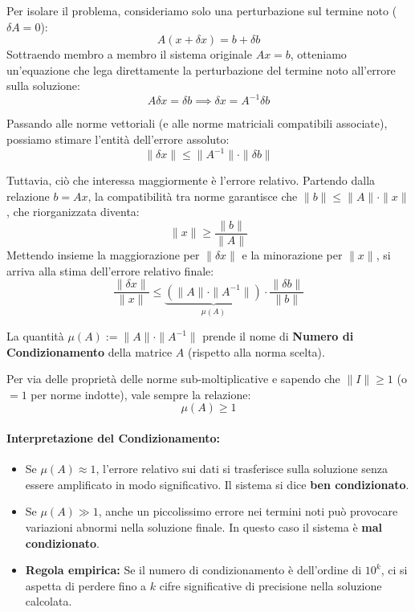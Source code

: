\documentclass[a4paper,12pt]{article}
\begin{document}
	Per isolare il problema, consideriamo solo una perturbazione sul termine noto ($\delta A = 0$):
	\begin{equation}
		A(x + \delta x) = b + \delta b
	\end{equation}
	Sottraendo membro a membro il sistema originale $Ax = b$, otteniamo un'equazione che lega direttamente la perturbazione del termine noto all'errore sulla soluzione:
	\begin{equation}
		A \delta x = \delta b \implies \delta x = A^{-1} \delta b
	\end{equation}
	
	Passando alle norme vettoriali (e alle norme matriciali compatibili associate), possiamo stimare l'entità dell'errore assoluto:
	$$ \|\delta x\| \le \|A^{-1}\| \cdot \|\delta b\| $$
	
	Tuttavia, ciò che interessa maggiormente è l'errore relativo. Partendo dalla relazione $b = Ax$, la compatibilità tra norme garantisce che $\|b\| \le \|A\| \cdot \|x\|$, che riorganizzata diventa:
	$$ \|x\| \ge \frac{\|b\|}{\|A\|} $$
	Mettendo insieme la maggiorazione per $\|\delta x\|$ e la minorazione per $\|x\|$, si arriva alla stima dell'errore relativo finale:
	\begin{equation}
		\frac{\|\delta x\|}{\|x\|} \le \underbrace{\left( \|A\| \cdot \|A^{-1}\| \right)}_{\mu(A)} \cdot \frac{\|\delta b\|}{\|b\|}
	\end{equation}
	
	\begin{tcolorbox}[title=Numero di Condizionamento, colback=red!5!white, colframe=red!75!black]
		La quantità $\mu(A) := \|A\| \cdot \|A^{-1}\|$ prende il nome di \textbf{Numero di Condizionamento} della matrice $A$ (rispetto alla norma scelta). 
		
		Per via delle proprietà delle norme sub-moltiplicative e sapendo che $\|I\| \ge 1$ (o $=1$ per norme indotte), vale sempre la relazione:
		$$ \mu(A) \ge 1 $$
	\end{tcolorbox}
	
	\paragraph{Interpretazione del Condizionamento:}
	\begin{itemize}
		\item Se $\mu(A) \approx 1$, l'errore relativo sui dati si trasferisce sulla soluzione senza essere amplificato in modo significativo. Il sistema si dice \textbf{ben condizionato}.
		\item Se $\mu(A) \gg 1$, anche un piccolissimo errore nei termini noti può provocare variazioni abnormi nella soluzione finale. In questo caso il sistema è \textbf{mal condizionato}.
		\item \textbf{Regola empirica:} Se il numero di condizionamento è dell'ordine di $10^k$, ci si aspetta di perdere fino a $k$ cifre significative di precisione nella soluzione calcolata.
	\end{itemize}
	
	
\end{document}
